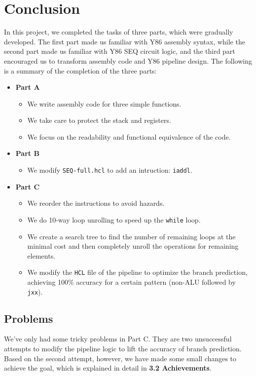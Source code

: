 \documentclass[12pt,a4paper]{article}
\begin{document}
\section{Conclusion}
In this project, we completed the tasks of three parts, which were gradually developed. The first part made us familiar with Y86 assembly syntax, while the second part made us familiar with Y86 SEQ circuit logic, and the third part encouraged us to transform assembly code and Y86 pipeline design.
The following is a summary of the completion of the three parts:
\begin{itemize}
	\item \textbf{Part A}
\begin{itemize}
        \item We write assembly code for three simple functions.
        \item We take care to protect the stack and registers.
        \item We focus on the readability and functional equivalence of the code.
\end{itemize}
	\item \textbf{Part B}
\begin{itemize}
        \item We modify \texttt{SEQ-full.hcl} to add an intruction: \texttt{iaddl}.
\end{itemize}
	\item \textbf{Part C}
\begin{itemize}
        \item We reorder the instructions to avoid hazards.
        \item We do 10-way loop unrolling to speed up the \texttt{while} loop.
        \item We create a search tree to find the number of remaining loops at the minimal cost and then completely unroll the operations for remaining elements.
        \item We modify the \texttt{HCL} file of the pipeline to optimize the branch prediction,  achieving 100\% accuracy for a certain pattern (non-ALU followed by \texttt{jxx}).
\end{itemize}
\end{itemize}
\subsection{Problems}
We've only had some tricky problems in Part C. They are two unsuccessful attempts to modify the pipeline logic to lift the accuracy of branch prediction.
Based on the second attempt, however, we have made some small changes to achieve the goal, which is explained in detail in \textbf{3.2 Achievements}.
\end{document}
